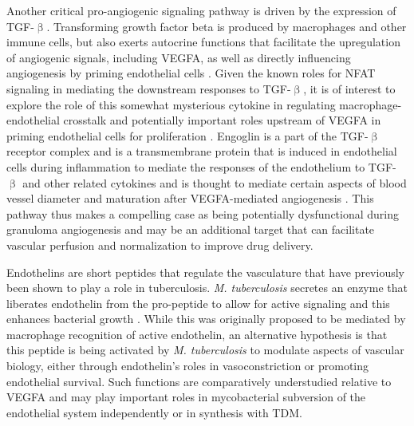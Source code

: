 Another critical pro\hyp{}angiogenic signaling pathway is driven by the expression of TGF\hyp{}$\upbeta$. Transforming growth factor beta is produced by macrophages and other immune cells, but also exerts autocrine functions that facilitate the upregulation of angiogenic signals, including VEGFA, as well as directly influencing angiogenesis by priming endothelial cells \citep{Jeon2007, Ferrari2009, Goumans2009}. Given the known roles for NFAT signaling in mediating the downstream responses to TGF\hyp{}$\upbeta$, it is of interest to explore the role of this somewhat mysterious cytokine in regulating macrophage\hyp{}endothelial crosstalk and potentially important roles upstream of VEGFA in priming endothelial cells for proliferation \citep{Cobbs2007}. Engoglin is a part of the TGF\hyp{}$\upbeta$ receptor complex and is a transmembrane protein that is induced in endothelial cells during inflammation to mediate the responses of the endothelium to TGF\hyp{}$\upbeta$ and other related cytokines and is thought to mediate certain aspects of blood vessel diameter and maturation after VEGFA\hyp{}mediated angiogenesis \citep{Liu2014, Sugden2017}. This pathway thus makes a compelling case as being potentially dysfunctional during granuloma angiogenesis and may be an additional target that can facilitate vascular perfusion and normalization to improve drug delivery. 

Endothelins are short peptides that regulate the vasculature that have previously been shown to play a role in tuberculosis. \textit{M. tuberculosis} secretes an enzyme that liberates endothelin from the pro\hyp{}peptide to allow for active signaling and this enhances bacterial growth \citep{Correa2014}. While this was originally proposed to be mediated by macrophage recognition of active endothelin, an alternative hypothesis is that this peptide is being activated by \textit{M. tuberculosis} to modulate aspects of vascular biology, either through endothelin's roles in vasoconstriction or promoting endothelial survival. Such functions are comparatively understudied relative to VEGFA and may play important roles in mycobacterial subversion of the endothelial system independently or in synthesis with TDM.

